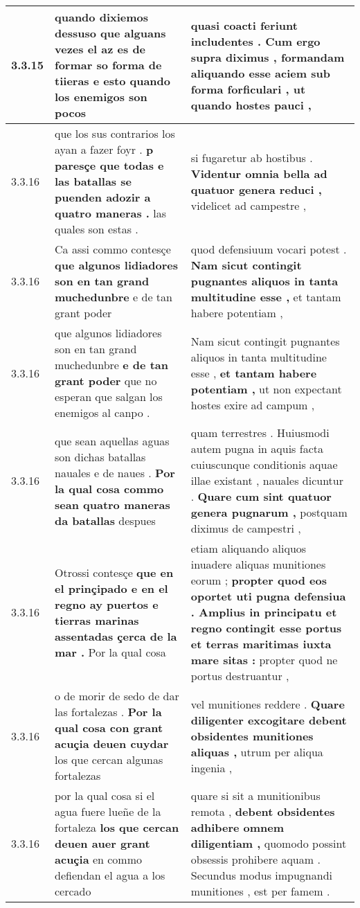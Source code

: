 \begin{tabular}{|p{1cm}|p{6.5cm}|p{6.5cm}|}
3.3.15 & quando dixiemos dessuso \textbf{ que alguans vezes el az es de formar so forma de tiieras } e esto quando los enemigos son pocos & quasi coacti feriunt includentes . \textbf{ Cum ergo supra diximus , formandam aliquando esse aciem sub forma forficulari , } ut quando hostes pauci , \\\hline
3.3.16 & que los sus contrarios los ayan a fazer foyr . \textbf{ p paresçe que todas e las batallas se puenden adozir a quatro maneras . } las quales son estas . & si fugaretur ab hostibus . \textbf{ Videntur omnia bella ad quatuor genera reduci , } videlicet ad campestre , \\\hline
3.3.16 & Ca assi commo contesçe \textbf{ que algunos lidiadores son en tan grand muchedunbre } e de tan grant poder & quod defensiuum vocari potest . \textbf{ Nam sicut contingit pugnantes aliquos in tanta multitudine esse , } et tantam habere potentiam , \\\hline
3.3.16 & que algunos lidiadores son en tan grand muchedunbre \textbf{ e de tan grant poder } que no esperan que salgan los enemigos al canpo . & Nam sicut contingit pugnantes aliquos in tanta multitudine esse , \textbf{ et tantam habere potentiam , } ut non expectant hostes exire ad campum , \\\hline
3.3.16 & que sean aquellas aguas son dichas batallas nauales e de naues . \textbf{ Por la qual cosa commo sean quatro maneras da batallas } despues & quam terrestres . Huiusmodi autem pugna in aquis facta cuiuscunque conditionis aquae illae existant , nauales dicuntur . \textbf{ Quare cum sint quatuor genera pugnarum , } postquam diximus de campestri , \\\hline
3.3.16 & Otrossi contesçe \textbf{ que en el prinçipado e en el regno ay puertos e tierras marinas assentadas çerca de la mar . } Por la qual cosa & etiam aliquando aliquos inuadere aliquas munitiones eorum ; \textbf{ propter quod eos oportet uti pugna defensiua . Amplius in principatu et regno contingit esse portus et terras maritimas iuxta mare sitas : } propter quod ne portus destruantur , \\\hline
3.3.16 & o de morir de sedo de dar las fortalezas . \textbf{ Por la qual cosa con grant acuçia deuen cuydar } los que cercan algunas fortalezas & vel munitiones reddere . \textbf{ Quare diligenter excogitare debent obsidentes munitiones aliquas , } utrum per aliqua ingenia , \\\hline
3.3.16 & por la qual cosa si el agua fuere lueñe de la fortaleza \textbf{ los que cercan deuen auer grant acuçia } en commo defiendan el agua a los cercado & quare si sit a munitionibus remota , \textbf{ debent obsidentes adhibere omnem diligentiam , } quomodo possint obsessis prohibere aquam . Secundus modus impugnandi munitiones , est per famem . \\\hline

\end{tabular}
